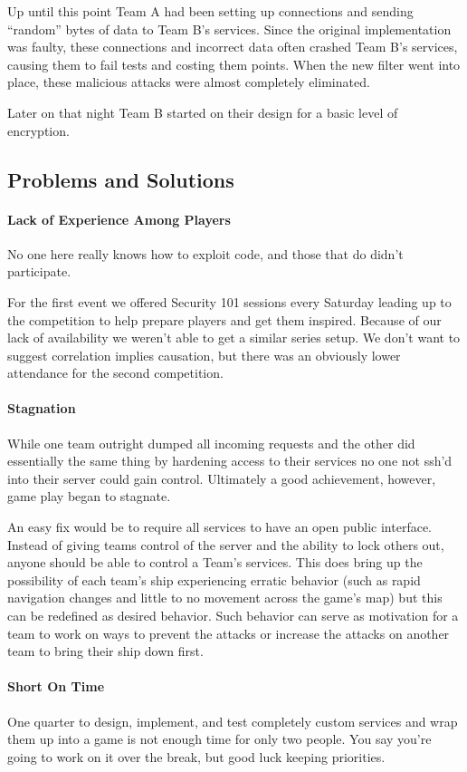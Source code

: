 \documentclass[10pt]{article}
\begin{document}
Up until this point Team A had been setting up connections and sending ``random''
bytes of data to Team B's services. Since the original implementation was
faulty, these connections and incorrect data often crashed Team B's services,
causing them to fail tests and costing them points. When the new filter went
into place, these malicious attacks were almost completely eliminated.

Later on that night Team B started on their design for a basic level of
encryption. 

\subsection{Problems and Solutions}
\paragraph*{Lack of Experience Among Players} No one here really knows how to
exploit code, and those that do didn't participate.

For the first event we offered Security 101 sessions every Saturday leading up
to the competition to help prepare players and get them inspired. Because of
our lack of availability we weren't able to get a similar series setup. We
don't want to suggest correlation implies causation, but there was an obviously
lower attendance for the second competition.

\paragraph*{Stagnation} While one team outright dumped all incoming requests and
the other did essentially the same thing by hardening access to their services
no one not ssh'd into their server could gain control. Ultimately a good
achievement, however, game play began to stagnate.

An easy fix would be to require all services to have an open public interface.
Instead of giving teams control of the server and the ability to lock others
out, anyone should be able to control a Team's services. This does bring up the
possibility of each team's ship experiencing erratic behavior (such as rapid
navigation changes and little to no movement across the game's map) but this
can be redefined as desired behavior. Such behavior can serve as motivation for
a team to work on ways to prevent the attacks or increase the attacks on
another team to bring their ship down first.

\paragraph*{Short On Time} One quarter to design, implement, and test completely
custom services and wrap them up into a game is not enough time for only two
people. You say you're going to work on it over the break, but good luck keeping
priorities.
\end{document}
